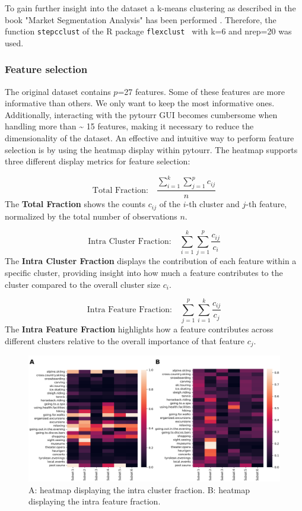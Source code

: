 \documentclass[article]{ajs}
\begin{document}
To gain further insight into the dataset a k-means clustering as described in the book "Market Segmentation Analysis" has been performed \citep{leisch2018market}. Therefore, the function \texttt{stepcclust} of the R package \texttt{flexclust
}\citep{flexclust} with k=6 and nrep=20 was used.

\subsubsection{Feature selection}

The original dataset contains \(p\)=27 features. Some of these features are more informative than others. We only want to keep the most informative ones. Additionally, interacting with the pytourr GUI becomes cumbersome when handling more than \textasciitilde
 15 features, making it necessary to reduce the dimensionality of the dataset. An effective and intuitive way to perform feature selection is by using the heatmap display within pytourr. The heatmap supports three different display metrics for feature selection:

\[
\text{Total Fraction:} \quad \frac{\displaystyle\sum_{i = 1}^{k} \sum_{j = 1}^{p} c_{ij}}{n}
\]
The \textbf{Total Fraction} shows the counts \(c_{ij}\) of the \(i\)-th cluster and \(j\)-th feature, normalized by the total number of observations \(n\).

\[
\text{Intra Cluster Fraction:} \quad \sum_{i = 1}^{k} \sum_{j = 1}^{p} \frac{c_{ij}}{c_{i}}
\]
The \textbf{Intra Cluster Fraction} displays the contribution of each feature within a specific cluster, providing insight into how much a feature contributes to the cluster compared to the overall cluster size \(c_i\).

\[
\text{Intra Feature Fraction:} \quad \sum_{j = 1}^{p} \sum_{i = 1}^{k} \frac{c_{ij}}{c_{j}}
\]
The \textbf{Intra Feature Fraction} highlights how a feature contributes across different clusters relative to the overall importance of that feature \(c_j\).

\begin{figure}[h!]
    \centering
    \includegraphics[width=1\textwidth]{winteractiv_heatmap.png}
    \caption{A: heatmap displaying the intra cluster fraction. B: heatmap displaying the intra feature fraction.}
    \label{fig:winteractiv_heatmap}
\end{figure}
\end{document}

